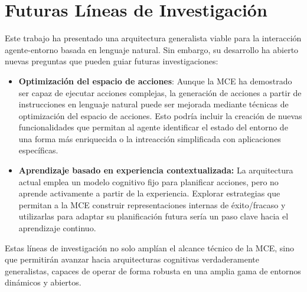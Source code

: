 \section{Futuras Líneas de Investigación}

Este trabajo ha presentado una arquitectura generalista viable para la
interacción agente-entorno basada en lenguaje natural. Sin embargo, su
desarrollo ha abierto nuevas preguntas que pueden guiar futuras
investigaciones:

\begin{itemize}
    \item \textbf{Optimización del espacio de acciones}: Aunque la MCE ha
    demostrado ser capaz de ejecutar acciones complejas, la generación de
    acciones a partir de instrucciones en lenguaje natural puede ser mejorada
    mediante técnicas de optimización del espacio de acciones. Esto podría incluir
    la creación de nuevas funcionalidades que permitan al agente identificar el
    estado del entorno de una forma más enriquecida o la intreacción simplificada
    con aplicaciones específicas.

    \item \textbf{Aprendizaje basado en experiencia contextualizada:} 
    La arquitectura actual emplea un modelo cognitivo fijo para planificar 
    acciones, pero no aprende activamente a partir de la experiencia. Explorar 
    estrategias que permitan a la MCE construir representaciones internas 
    de éxito/fracaso y utilizarlas para adaptar su planificación futura 
    sería un paso clave hacia el aprendizaje continuo.
\end{itemize}

Estas líneas de investigación no solo amplían el alcance técnico de la MCE, sino
que permitirán avanzar hacia arquitecturas cognitivas verdaderamente
generalistas, capaces de operar de forma robusta en una amplia gama de entornos
dinámicos y abiertos.

